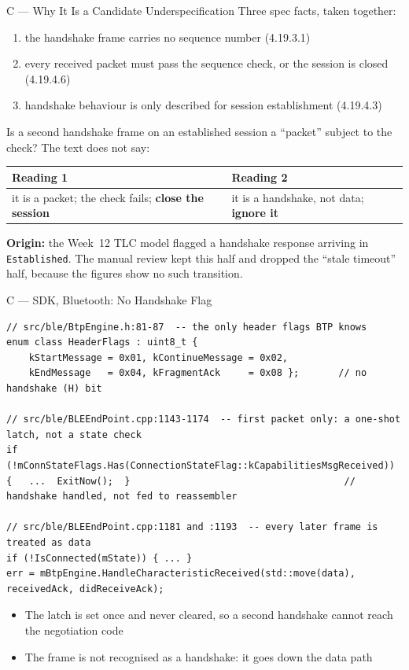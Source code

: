 \documentclass[10pt,aspectratio=169,t]{beamer}
\begin{document}
\begin{frame}{C --- Why It Is a Candidate Underspecification}
\small
Three spec facts, taken together:
\begin{enumerate}
  \item the handshake frame carries no sequence number (4.19.3.1)
  \item every received packet must pass the sequence check, or the session is
        closed (4.19.4.6)
  \item handshake behaviour is only described for session establishment
        (4.19.4.3)
\end{enumerate}
\vspace{2pt}
Is a second handshake frame on an established session a ``packet'' subject to
the check? The text does not say:
\begin{center}
\small
\begin{tabular}{p{}p{}}
\toprule
\textbf{Reading 1} & \textbf{Reading 2} \\
\midrule
it is a packet; the check fails; \textbf{close the session}
 & it is a handshake, not data; \textbf{ignore it} \\
\bottomrule
\end{tabular}
\end{center}
\vspace{2pt}
\textbf{Origin:} the Week~12 TLC model flagged a handshake response arriving in
\texttt{Established}. The manual review kept this half and dropped the ``stale
timeout'' half, because the figures show no such transition.
\end{frame}

\begin{frame}[fragile]{C --- SDK, Bluetooth: No Handshake Flag}
\begin{lstlisting}[style=cppsmall]
// src/ble/BtpEngine.h:81-87  -- the only header flags BTP knows
enum class HeaderFlags : uint8_t {
    kStartMessage = 0x01, kContinueMessage = 0x02,
    kEndMessage   = 0x04, kFragmentAck     = 0x08 };       // no handshake (H) bit

// src/ble/BLEEndPoint.cpp:1143-1174  -- first packet only: a one-shot latch, not a state check
if (!mConnStateFlags.Has(ConnectionStateFlag::kCapabilitiesMsgReceived))
{   ...  ExitNow();  }                                      // handshake handled, not fed to reassembler

// src/ble/BLEEndPoint.cpp:1181 and :1193  -- every later frame is treated as data
if (!IsConnected(mState)) { ... }
err = mBtpEngine.HandleCharacteristicReceived(std::move(data), receivedAck, didReceiveAck);
\end{lstlisting}
\begin{itemize}\small
  \item The latch is set once and never cleared, so a second handshake cannot
        reach the negotiation code
  \item The frame is not recognised as a handshake: it goes down the data path
\end{itemize}
\end{frame}
\end{document}
